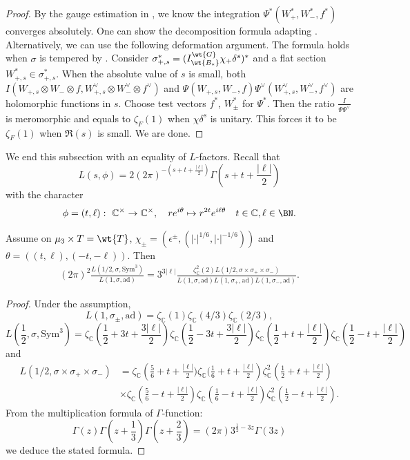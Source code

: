 \documentclass[11pt,reqno]{amsart}
\newcommand{\BC}{{\mathbb {C}}} \newcommand{\BD}{{\mathbb {D}}}
\newcommand{\ad}{{\mathrm{ad}}}\newcommand{\al}{{\mathrm{al}}}
\newcommand{\Sym}{{\mathrm{Sym}}}\newcommand{\sgn}{{\mathrm{sgn}}}
\theoremstyle{plain}
\theoremstyle{remark} \newtheorem{remark}[thm]{Remark}
\theoremstyle{definition} \newtheorem{exercise}[thm]{Exercise}
\theoremstyle{definition} \newtheorem{example}[thm]{Example} \newtheorem{condition}[thm]{Condition}
\numberwithin{equation}{section}
\renewcommand{\-}{\text{--}}
\begin{document}
\begin{proof}By the gauge estimation in \cite[Proposition 2.1]{Ich08}, we know the integration $\Psi^*(W^*_+,W^*_-,f^*)$ converges absolutely. One can show the decomposition formula adapting \cite[Proposition 5.2]{Hsi21}. Alternatively, we can use the following deformation argument. The formula holds when $\sigma$ is tempered  by \cite[Lemma 4.2]{MV10}. Consider $\sigma_{+,s}^*=(I_{\wt{B_*}}^{\wt{G}}\chi_+\delta^s)^*$ and a flat section $W_{+,s}^*\in \sigma_{+,s}^*$. When the absolute value of $s$ is small, both $I(W_{+,s}\otimes W_-\otimes f, W_{+,s}^\vee\otimes W_-^\vee\otimes f^\vee)$ and $\Psi(W_{+,s},W_-,f)\Psi^\vee(W_{+,s}^\vee,W_-^\vee,f^\vee)$ are holomorphic functions in   $s$. Choose   test vectors $f^*$, $W^*_\pm$ for  $\Psi^*$. Then the ratio $\frac{I}{\Psi\Psi^\vee}$ is meromorphic and  equals to $\zeta_F(1)$ when $\chi\delta^s$ is unitary. This forces it to be  $\zeta_F(1)$ when  $\Re(s)$ is small. We are done.
\end{proof}
We end this subsection with an equality of $L$-factors. Recall that
\[L(s,\phi)=2(2\pi)^{-(s+t+\frac{|\ell|}{2})}\Gamma\left(s+t+\frac{|\ell|}{2}\right)\]
 with the character \[\phi=(t,\ell):\ \BC^\times\to \BC^\times,\quad re^{i\theta}\mapsto r^{2t}e^{i\ell \theta }\quad t\in\BC, \ell\in\BN.\] 
\begin{prop}Assume  on $\mu_3\times T=\wt{T}$,  $\chi_{\pm}=\left(\epsilon^\pm, (|\cdot|^{1/6},|\cdot|^{-1/6})\right)$ and $\theta=((t,\ell),(-t,-\ell))$. Then 
\begin{align*}
(2\pi)^2\frac{L(1/2,\sigma,\Sym^3)}{L(1,\sigma,\ad)}=3^{3|\ell|}\frac{\zeta_\BC^2(2)L(1/2,\sigma\times\sigma_+\times\sigma_-)}{L(1,\sigma,\ad)L(1,\sigma_+,\ad)L(1,\sigma_-,\ad)}.
\end{align*}
\end{prop}
\begin{proof}Under the assumption, \[L(1,\sigma_\pm,\ad)=\zeta_\BC(1)\zeta_\BC(4/3)\zeta_\BC(2/3),\]
\[L(\frac{1}{2},\sigma,\Sym^3)=\zeta_\BC\left(\frac{1}{2}+3t+\frac{3|\ell|}{2}\right)\zeta_\BC\left(\frac{1}{2}-3t+\frac{3|\ell|}{2}\right)\zeta_\BC\left(\frac{1}{2}+t+\frac{|\ell|}{2}\right)\zeta_\BC\left(\frac{1}{2}-t+\frac{|\ell|}{2}\right)\]
and
\begin{align*}L(1/2,\sigma\times\sigma_+\times\sigma_-)&=\zeta_\BC\left(\frac{5}{6}+t+\frac{|\ell|}{2})\zeta_\BC(\frac{1}{6}+t+\frac{|\ell|}{2}\right)\zeta_\BC^2\left(\frac{1}{2}+t+\frac{|\ell|}{2}\right)\\
&\times \zeta_\BC\left(\frac{5}{6}-t+\frac{|\ell|}{2}\right)\zeta_\BC\left(\frac{1}{6}-t+\frac{|\ell|}{2}\right)\zeta_\BC^2\left(\frac{1}{2}-t+\frac{|\ell|}{2}\right).
\end{align*}
From the multiplication formula of $\Gamma$-function:
\[\Gamma(z)\Gamma\left(z+\frac{1}{3}\right)\Gamma\left(z+\frac{2}{3}\right)=(2\pi)3^{\frac{1}{2}-3z}\Gamma(3z)\]
we deduce the stated formula.
\end{proof}
\end{document}
